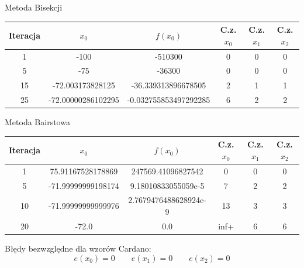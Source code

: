 \documentclass[a4paper]{article}
\begin{document}
    \begin{center}
        Metoda Bisekcji
    \end{center}
    \begin{center}
        \begin{tabular}{|c|c|c|c|c|c|} 
            \hline
            Iteracja & $x_0$ & $f(x_0)$ & C.z. $x_0$ & C.z. $x_1$ & C.z. $x_2$ \\
            \hline
            1 & -100 & -510300 & 0 & 0 & 0 \\
            \hline
            5 & -75 & -36300 & 0 & 0 & 0 \\
            \hline
            15 & -72.003173828125 & -36.339313896678505 & 2 & 1 & 1 \\
            \hline
            25 & -72.00000286102295 & -0.032755853497292285 & 6 & 2 & 2 \\
            \hline
        \end{tabular}
    \end{center}
    
    \vspace{5mm}

    \begin{center}
        Metoda Bairstowa
    \end{center}
    \begin{center}
        \begin{tabular}{|c|c|c|c|c|c|} 
            \hline
            Iteracja & $x_0$ & $f(x_0)$ & C.z. $x_0$ & C.z. $x_1$ & C.z. $x_2$ \\
            \hline
            1 & 75.91167528178869 & 247569.41096827542 & 0 & 0 & 0 \\ 
            \hline
            5 & -71.99999999198174 & 9.18010833055059e-5 & 7 & 2 & 2 \\ 
            \hline
            10 & -71.99999999999976 & 2.7679476488628924e-9 & 13 & 3 & 3 \\
            \hline
            20 & -72.0 & 0.0 & inf+ & 6 & 6 \\
            \hline
        \end{tabular}
    \end{center}

    \vspace{5mm}

    \begin{center}
        Błędy bezwzględne dla wzorów Cardano:
        \[
            e(x_0) = 0 \qquad e(x_1) = 0 \qquad e(x_2) = 0  
        \]
    \end{center}
\end{document}
